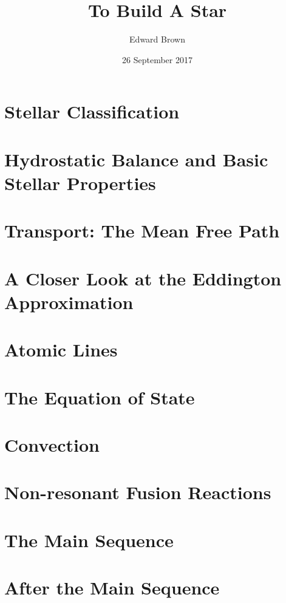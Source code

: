 \documentclass[profonts,stix,symmetric]{astro-bookshelf}
\title{To Build A Star}
\author{Edward Brown}
\date{26 September 2017}
\begin{document}
\frontmatter
{}


\mainmatter
{}
\setcounter{page}{1}

\chapter{Stellar Classification}\label{ch.classifying-stars}


\chapter{Hydrostatic Balance and Basic Stellar Properties}\label{ch.hydrostatic-balance}


\chapter{Transport: The Mean Free Path}\label{ch.mean-free-path}


\chapter{A Closer Look at the Eddington Approximation}\label{ch.stellar-atmospheres}


\chapter{Atomic Lines}\label{ch.atomic-lines}


\chapter{The Equation of State}\label{ch.degeneracy}


\chapter{Convection}\label{ch.convection}


\chapter{Non-resonant Fusion Reactions}\label{ch.nuclear-burning}


\chapter{The Main Sequence}\label{ch.main-sequence}


\chapter{After the Main Sequence}\label{ch.post-main-sequence}



\backmatter


\end{document}
